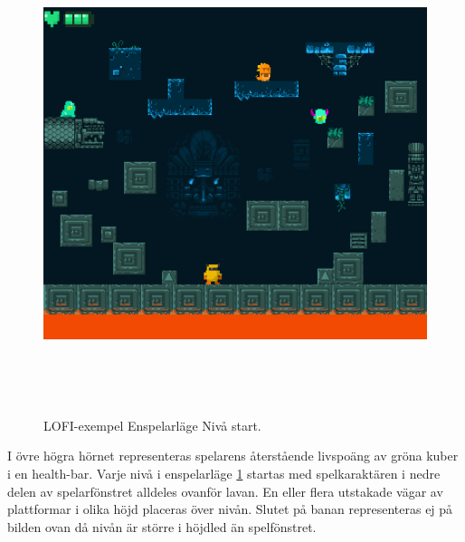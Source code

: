 \documentclass{TDP005mall}
\begin{document}
\begin{figure}[h!]
  \caption{LOFI-exempel Enspelarläge Nivå start.\label{fig:7}}
  \centerline{\includegraphics[width=\textwidth, height=14cm]{images/game_example.png}}  
\end{figure}

I övre högra hörnet representeras spelarens återstående livspoäng av gröna kuber i en health-bar. Varje nivå i enspelarläge \ref{fig:7} startas med spelkaraktären i nedre delen av spelarfönstret alldeles ovanför lavan. En eller flera utstakade vägar av plattformar i olika höjd placeras över nivån. Slutet på banan representeras ej på bilden ovan då nivån är större i höjdled än spelfönstret.
\end{document}

